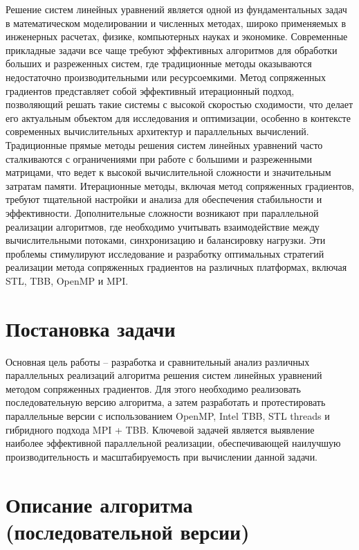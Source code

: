 \documentclass[12pt]{article}
\begin{document}
\hspace*{1.35em} Решение систем линейных уравнений является одной из фундаментальных задач в математическом моделировании и численных методах, широко применяемых в инженерных расчетах, физике, компьютерных науках и экономике. 
Современные прикладные задачи все чаще требуют эффективных алгоритмов для обработки больших и разреженных систем, где традиционные методы оказываются недостаточно производительными или ресурсоемкими. Метод сопряженных градиентов представляет собой эффективный итерационный подход, позволяющий решать такие системы с высокой скоростью сходимости,
что делает его актуальным объектом для исследования и оптимизации, особенно в контексте современных вычислительных архитектур и параллельных вычислений.
Традиционные прямые методы решения систем линейных уравнений часто сталкиваются с ограничениями при работе с большими и разреженными матрицами, что ведет к высокой вычислительной сложности и значительным затратам памяти. 
Итерационные методы, включая метод сопряженных градиентов, требуют тщательной настройки и анализа для обеспечения стабильности и эффективности. Дополнительные сложности возникают при параллельной реализации алгоритмов, где необходимо учитывать взаимодействие между вычислительными потоками, синхронизацию и балансировку нагрузки. 
Эти проблемы стимулируют исследование и разработку оптимальных стратегий реализации метода сопряженных градиентов на различных платформах, включая STL, TBB, OpenMP и MPI.

\section{Постановка задачи}

\hspace*{1.35em}Основная цель работы – разработка и сравнительный анализ различных параллельных реализаций алгоритма решения систем линейных уравнений методом сопряженных градиентов. 
Для этого необходимо реализовать последовательную версию алгоритма, а затем разработать и протестировать параллельные версии с использованием OpenMP, Intel TBB, STL threads и гибридного подхода MPI + TBB. Ключевой задачей является выявление наиболее эффективной параллельной реализации, обеспечивающей наилучшую производительность и масштабируемость при вычислении данной задачи.

\section{Описание алгоритма (последовательной версии)}
\end{document}

